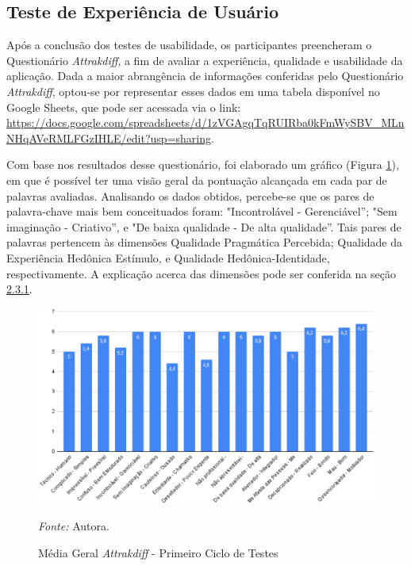 \subsection{Teste de Experiência de Usuário}
\label{sec:Teste de Experiência de Usuário}
Após a conclusão dos testes de usabilidade, os participantes preencheram o Questionário \textit{Attrakdiff}, a fim de 
avaliar a experiência, qualidade e usabilidade da aplicação. Dada a maior abrangência de informações conferidas pelo Questionário \textit{Attrakdiff}, optou-se por representar esses dados em uma tabela disponível no Google Sheets, que pode ser acessada via o link: 
\url{https://docs.google.com/spreadsheets/d/1zVGAgqTqRUIRba0kFmWySBV_MLnNHqAVeRMLFGzIHLE/edit?usp=sharing}. 

Com base nos resultados desse questionário, foi elaborado um gráfico (Figura \ref{fig20}), em que é possível ter uma visão geral da pontuação alcançada em cada par de palavras avaliadas. Analisando os dados obtidos, percebe-se que os pares de palavra-chave mais bem conceituados foram: "Incontrolável - Gerenciável''; "Sem imaginação - Criativo'', e "De baixa qualidade - De alta qualidade''. 
Tais pares de palavras pertencem às dimensões Qualidade Pragmática Percebida; Qualidade da Experiência Hedônica Estímulo, e Qualidade Hedônica-Identidade, respectivamente. A explicação acerca das dimensões 
pode ser conferida na seção \hyperref[sec:Medicao2]{2.3.1}. 

\begin{figure}[h!]
	\centering
	\caption{Média Geral \textit{Attrakdiff} - Primeiro Ciclo de Testes}
	\begin{adjustbox}{center}
		\includegraphics[width=1\textwidth]{figuras/media-geral.eps}
	\end{adjustbox}
	\begin{tablenotes}[flushleft]
		\centering
		\item \textit{Fonte:} Autora.
	\end{tablenotes}
	\label{fig20}
\end{figure}


